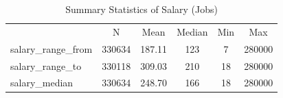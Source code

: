 \begin{table}[htbp]\centering
\def\sym#1{\ifmmode^{#1}\else\(^{#1}\)\fi}
\caption{Summary Statistics of Salary (Jobs)}
\begin{tabular}{l*{1}{ccccc}}
\toprule
                    &           N&        Mean&      Median&         Min&         Max\\
\label{tab:companysalary}
salary\_range\_from   &      330634&      187.11&         123&           7&      280000\\
salary\_range\_to     &      330118&      309.03&         210&          18&      280000\\
salary\_median       &      330634&      248.70&         166&          18&      280000\\
\bottomrule
\end{tabular}
\end{table}
